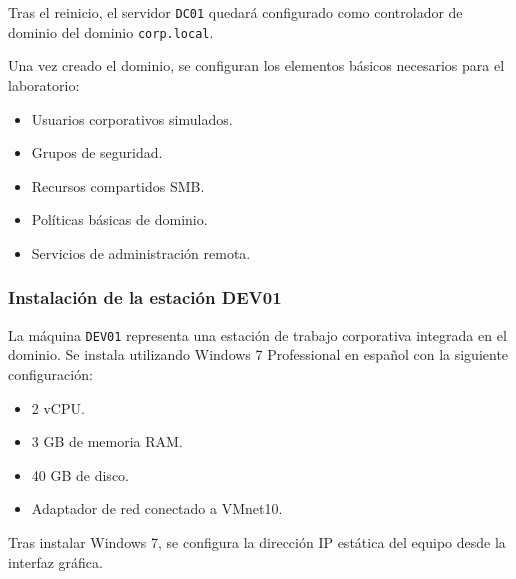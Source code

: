Tras el reinicio, el servidor \texttt{DC01} quedará configurado como controlador de dominio del dominio \texttt{corp.local}.


Una vez creado el dominio, se configuran los elementos básicos necesarios para el laboratorio:

\begin{itemize}
    \item Usuarios corporativos simulados.
    \item Grupos de seguridad.
    \item Recursos compartidos SMB.
    \item Políticas básicas de dominio.
    \item Servicios de administración remota.
\end{itemize}

\subsubsection*{Instalación de la estación DEV01}

La máquina \texttt{DEV01} representa una estación de trabajo corporativa integrada en el dominio. Se instala utilizando Windows 7 Professional en español con la siguiente configuración:

\begin{itemize}
    \item 2 vCPU.
    \item 3 GB de memoria RAM.
    \item 40 GB de disco.
    \item Adaptador de red conectado a VMnet10.
\end{itemize}


Tras instalar Windows 7, se configura la dirección IP estática del equipo desde la interfaz gráfica.

